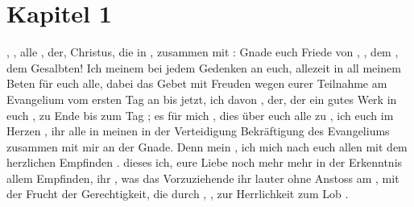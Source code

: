 
\section*{Kapitel 1}
  , , alle , der, Christus, die in  , zusammen mit   : Gnade euch  Friede von , ,  dem , dem Gesalbten! Ich  meinem  bei jedem Gedenken an euch, allezeit in all meinem Beten für euch alle, dabei das Gebet mit Freuden  wegen eurer Teilnahme am Evangelium vom ersten Tag an bis jetzt,  ich davon ,  der, der ein gutes Werk in euch ,  zu Ende  bis zum Tag ;  es für mich , dies über euch alle zu ,  ich euch im Herzen ,  ihr alle  in meinen   in der Verteidigung  Bekräftigung des Evangeliums zusammen mit mir   an der Gnade. Denn   mein ,  ich mich nach euch allen  mit dem herzlichen Empfinden .  dieses  ich,  eure Liebe noch mehr  mehr  in der Erkenntnis  allem Empfinden,  ihr , was das Vorzuziehende   ihr lauter  ohne Anstoss  am ,  mit der Frucht der Gerechtigkeit, die durch , , zur Herrlichkeit  zum Lob .

